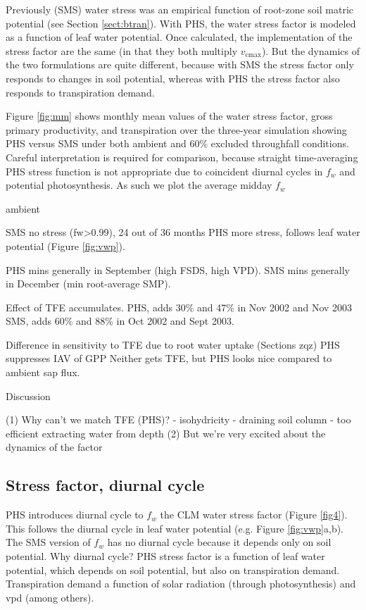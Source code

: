 \documentclass[draft,linenumbers]{agujournal}
\begin{document}
Previously (SMS) water stress was an empirical function of root-zone soil matric potential (see Section \ref{sect:btran}).
With PHS, the water stress factor is modeled as a function of leaf water potential.
Once calculated, the implementation of the stress factor are the same (in that they both multiply $v_{\text{cmax}}$).
But the dynamics of the two formulations are quite different, because with SMS the stress factor only responds to changes in soil potential,
whereas with PHS the stress factor also responds to transpiration demand.

Figure \ref{fig:mm} shows monthly mean values of the water stress factor, gross primary productivity, and transpiration
over the three-year simulation showing PHS versus SMS under both ambient and 60\% excluded throughfall conditions.
Careful interpretation is required for comparison, because straight time-averaging PHS stress function is not appropriate due to coincident diurnal cycles in $f_w$ and potential photosynthesis.
As such we plot the average midday $f_w$


ambient

SMS no stress (fw>0.99), 24 out of 36 months
PHS more stress, follows leaf water potential (Figure \ref{fig:vwp}).

PHS mins generally in September (high FSDS, high VPD).
SMS mins generally in December (min root-average SMP).

Effect of TFE accumulates. 
PHS, adds 30\% and 47\% in Nov 2002 and Nov 2003
SMS, adds 60\% and 88\% in Oct 2002 and Sept 2003.

Difference in sensitivity to TFE due to root water uptake (Sections zqz)
PHS suppresses IAV of GPP
Neither gets TFE, but PHS looks nice compared to ambient sap flux.

Discussion

(1) Why can't we match TFE (PHS)?
        - isohydricity
        - draining soil column
        - too efficient extracting water from depth
(2) But we're very excited about the dynamics of the factor

\subsection{Stress factor, diurnal cycle}

PHS introduces diurnal cycle to $f_w$ the CLM water stress factor (Figure \ref{fig4}). 
This follows the diurnal cycle in leaf water potential (e.g. Figure \ref{fig:vwp}a,b).
The SMS version of $f_w$ has no diurnal cycle because it depends only on soil potential.
Why diurnal cycle?
PHS stress factor is a function of leaf water potential, which depends on soil potential, but also on transpiration demand.
Transpiration demand a function of solar radiation (through photosynthesis) and vpd (among others).
\end{document}
